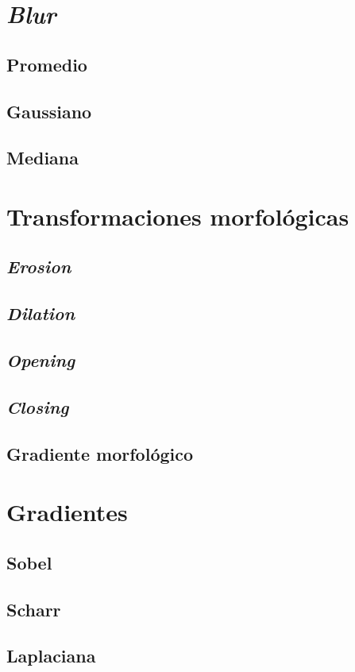 \section{\emph{Blur}}
\subsection{Promedio}
\subsection{Gaussiano}
\subsection{Mediana}

\section{Transformaciones morfológicas}
\subsection{\emph{Erosion}}
\subsection{\emph{Dilation}}
\subsection{\emph{Opening}}
\subsection{\emph{Closing}}
\subsection{Gradiente morfológico}

\section{Gradientes}
\subsection{Sobel}
\subsection{Scharr}
\subsection{Laplaciana}

